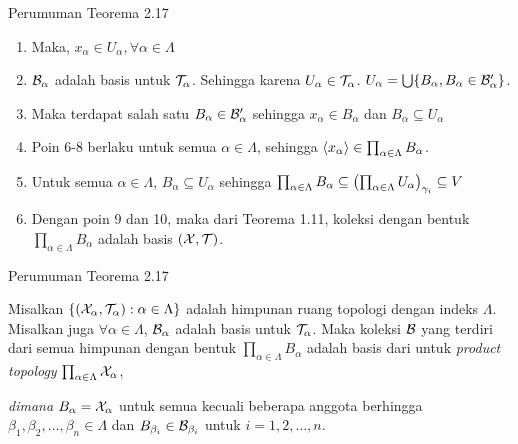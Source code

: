 \begin{frame}{Perumuman Teorema 2.17}
    \begin{tcolorbox}[enhanced,title=Teorema 2.29  (Bukti), frame style tile={width=\paperwidth}{\wallpaper}]
        \begin{enumerate}\addtocounter{enumi}{5}
            \item Maka, $x_\alpha \in U_\alpha, \forall \alpha \in \Lambda$ 
            \item $\nB_\alpha$ adalah basis untuk $\nT_\alpha$. Sehingga karena $U_\alpha\in \nT_\alpha$.
            $U_\alpha = \bigcup\set*{B_\alpha, B_\alpha \in \nB'_\alpha}$.
            \item Maka terdapat salah satu $B_\alpha \in \nB'_\alpha$ sehingga
            $x_\alpha \in B_\alpha$ dan $B_\alpha \subseteq U_\alpha$
            \item Poin 6-8 berlaku untuk semua $\alpha \in \Lambda$, sehingga $\seq*{x_\alpha}\in\prod_{\alpha\in\Lambda}B_\alpha$.
            \item Untuk semua $\alpha \in \Lambda$, $B_\alpha \subseteq U_\alpha$ sehingga $\prod_{\alpha\in\Lambda}B_\alpha \subseteq \oio*{\prod_{\alpha\in\Lambda}U_\alpha}_{\gamma_i}\subseteq V$
            \item Dengan poin 9 dan 10, maka dari Teorema 1.11, koleksi dengan bentuk $\prod_{\alpha\in\Lambda}B_\alpha$ adalah basis $(\nX,\nT)$.
        \end{enumerate}
    \end{tcolorbox}
\end{frame}

\begin{frame}{Perumuman Teorema 2.17}
    \begin{tcolorbox}[enhanced,title=Teorema 2.30, frame style tile={width=\paperwidth}{\wallpaper}]
        Misalkan $\set*{\oio*{\nX_\alpha,\nT_\alpha}:\alpha \in \Lambda}$ adalah himpunan ruang topologi
        dengan indeks $\Lambda$. Misalkan juga $\forall \alpha \in \Lambda$, $\nB_\alpha$ adalah basis 
        untuk $\nT_\alpha$. Maka koleksi $\nB$ yang terdiri dari semua himpunan dengan bentuk 
        $\prod_{\alpha \in \Lambda}B_\alpha$ adalah basis dari untuk \textit{product topology} $\prod_{\alpha \in \Lambda}\nX_\alpha$,
        
        \textit{dimana} $B_\alpha=\nX_\alpha$ untuk semua kecuali beberapa
        anggota berhingga $\beta_1,\beta_2,\dots,\beta_n\in\Lambda$ dan $B_{\beta_i}\in\nB_{\beta_i}$
        untuk $i=1,2,\dots,n$. 
    \end{tcolorbox}
\end{frame}

